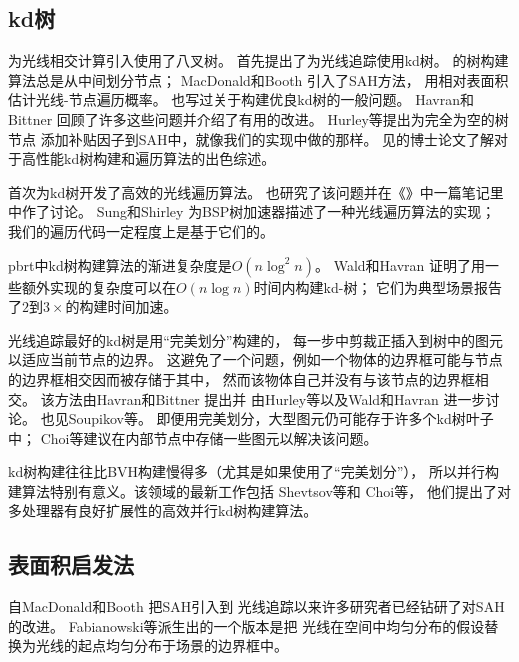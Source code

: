 \subsection{kd树}\label{sub:kd树}
\citet{6429331}为光线相交计算引入使用了八叉树。
\citet{kaplan1985use}首先提出了为光线追踪使用kd树。
\citeauthor{kaplan1985use}的树构建算法总是从中间划分节点；
MacDonald和Booth \parencite*{MacDonald1990}引入了SAH方法，
用相对表面积估计光线-节点遍历概率。
\citet{Naylor1993:27}也写过关于构建优良kd树的一般问题。
Havran和Bittner \parencite*{HavranImproving2002}回顾了许多这些问题并介绍了有用的改进。
Hurley等\parencite*{hurley2002fast}提出为完全为空的树节点
添加补贴因子到SAH中，就像我们的实现中做的那样。
见\citet{Havran2000:PhD}的博士论文了解对于高性能kd树构建和遍历算法的出色综述。


\citet{10.1007/978-3-642-71071-1_4}首次为kd树开发了高效的光线遍历算法。
\citet{ArvoRay1988}也研究了该问题并在《{\itshape{}}》中一篇笔记里中作了讨论。
Sung和Shirley \parencite*{SUNG1992271}为BSP树加速器描述了一种光线遍历算法的实现；
我们的遍历代码一定程度上是基于它们的。

pbrt中kd树构建算法的渐进复杂度是$O(n\log^2n)$。
Wald和Havran \parencite*{4061547}证明了用一些额外实现的复杂度可以在$O(n\log n)$时间内构建kd-树；
它们为典型场景报告了$2$到$3\times$的构建时间加速。

光线追踪最好的kd树是用“完美划分”构建的，
每一步中剪裁正插入到树中的图元以适应当前节点的边界。
这避免了一个问题，例如一个物体的边界框可能与节点的边界框相交因而被存储于其中，
然而该物体自己并没有与该节点的边界框相交。
该方法由Havran和Bittner \parencite*{HavranImproving2002}提出并
由Hurley等\parencite*{hurley2002fast}以及Wald和Havran \parencite*{4061547}进一步讨论。
也见Soupikov等\parencite*{4634623}。
即便用完美划分，大型图元仍可能存于许多个kd树叶子中；
Choi等\parencite*{10.1111/cgf.12241}建议在内部节点中存储一些图元以解决该问题。

kd树构建往往比BVH构建慢得多（尤其是如果使用了“完美划分”），
所以并行构建算法特别有意义。该领域的最新工作包括
Shevtsov等\parencite*{10.1111/j.1467-8659.2007.01062.x}和
Choi等\parencite*{10.5555/1921479.1921492}，
他们提出了对多处理器有良好扩展性的高效并行kd树构建算法。

\subsection{表面积启发法}\label{sub:表面积启发法2}
自MacDonald和Booth \parencite*{MacDonald1990}把SAH引入到
光线追踪以来许多研究者已经钻研了对SAH的改进。
Fabianowski等\parencite*{10.2312:egs.20091046}派生出的一个版本是把
光线在空间中均匀分布的假设替换为光线的起点均匀分布于场景的边界框中。